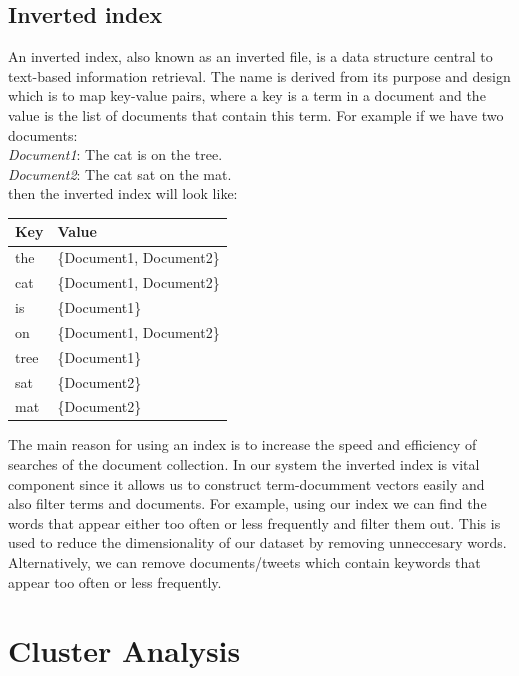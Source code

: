 \subsection{Inverted index}
An inverted index, also known as an inverted file, is a data structure central to text-based information retrieval. The name is derived from its 
purpose and design which is to map key-value pairs, where a key is a term in a document and the value is the list of documents that contain this term.
For example if we have two documents:\\
\emph{Document1}: The cat is on the tree. \\
\emph{Document2}: The cat sat on the mat. \\
then the inverted index will look like:

\begin{center}
\begin{tabular}{ |l | l| }
  \hline
  \textbf{Key} & \textbf{Value} \\ \hline
  the & \{Document1, Document2\} \\
  cat & \{Document1, Document2\} \\
  is & \{Document1\} \\
  on & \{Document1, Document2\} \\
  tree & \{Document1\} \\
  sat & \{Document2\} \\
  mat & \{Document2\} \\
  \hline
\end{tabular}
\end{center}

The main reason for using an index is to increase the speed and efficiency of searches of the document 
collection. In our system the inverted index is vital component since it allows us to construct
term-documment vectors easily and also filter terms and documents. For example, using our index we
can find the words that appear either too often or less frequently and filter them out. This is used
to reduce the dimensionality of our dataset by removing unneccesary words. Alternatively, we
can remove documents/tweets which contain keywords that appear too often or less frequently.

\section{Cluster Analysis}

